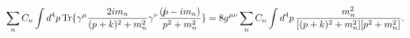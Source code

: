 \begin{equation}
\sum_n C_n \int d^4p \, {\rm Tr}\{\gamma^\mu {2i m_n \over {(p +
k)^2 + m^2_n }} \gamma^\nu
{({p\kern-0.15em\raise0.17ex\llap{/}\kern0.15em\relax} -i m_n)
\over {p^2 + m^2_n}}\} = 8g^{\mu\nu} \sum_n C_n \int d^4p
\,{{m^2_n} \over {[(p + k)^2 + m^2_n][p^2 + m^2_n] }}.
\end{equation}

